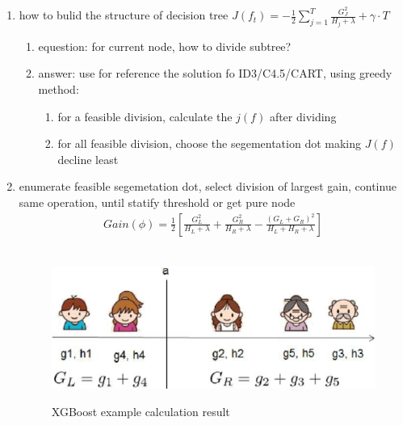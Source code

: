 \documentclass[12pt]{ctexart}%
\begin{document}
\begin{enumerate}
				\item how to bulid the structure of decision tree $J(f_t) = -\frac{1}{2} \sum_{j=1}^{T} \frac{G_J^2}{H_j + \lambda} + \gamma \cdot T$
					\begin{enumerate}
						\item equestion: for current node, how to divide subtree?
						
						\item answer: use for reference the solution fo ID3/C4.5/CART, using greedy method:
							\begin{enumerate}
								\item for a feasible division, calculate the $j(f)$ after dividing
								
								\item for all feasible division, choose the segementation dot making $J(f)$ decline least
							\end{enumerate}
					\end{enumerate}
				
				\item enumerate feasible segemetation dot, select division of largest gain, continue same operation, until statify threshold or get pure node
					\begin{align}
						Gain(\phi) = \frac{1}{2} \left[ \frac{G_L^2}{H_L + \lambda} + \frac{G_R^2}{H_R + \lambda} - \frac{(G_L + G_R)^2}{H_L + H_R + \lambda} \right]
					\end{align}
					\begin{figure}[H]
						\vspace{-0.6cm}  %
						\setlength{\abovecaptionskip}{-0.2cm}   %
						\centering
						\includegraphics[scale=0.6]{XGBoost_example_calculation_result.png}
						\renewcommand{\figurename}{Fig} %
						\caption{XGBoost example calculation result}
						\label{fig:4}
					\end{figure}
			\end{enumerate}
		
\end{document}
